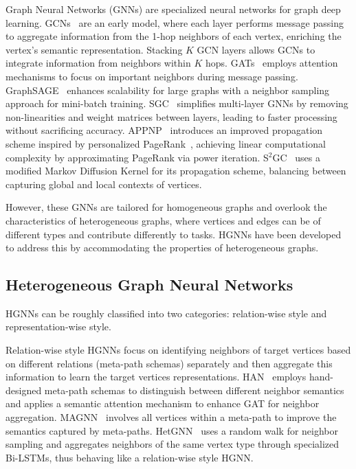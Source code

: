 \documentclass[lettersize,journal]{IEEEtran}
\begin{document}
Graph Neural Networks (GNNs) are specialized neural networks for graph deep learning.
GCNs~\cite{DBLP:conf/iclr/KipfW17} are an early model, where each layer performs message passing to aggregate information from the 1-hop neighbors of each vertex, enriching the vertex's semantic representation. 
Stacking $K$ GCN layers allows GCNs to integrate information from neighbors within $K$ hops.
GATs~\cite{DBLP:conf/iclr/VelickovicCCRLB18} employs attention mechanisms to focus on important neighbors during message passing.
GraphSAGE~\cite{DBLP:conf/nips/HamiltonYL17} enhances scalability for large graphs with a neighbor sampling approach for mini-batch training. 
SGC~\cite{DBLP:conf/icml/WuSZFYW19} simplifies multi-layer GNNs by removing non-linearities and weight matrices between layers, leading to faster processing without sacrificing accuracy.
APPNP~\cite{DBLP:conf/iclr/KlicperaBG19} introduces an improved propagation scheme inspired by personalized PageRank~\cite{Page1999ThePC}, achieving linear computational complexity by approximating PageRank via power iteration. 
S$^2$GC~\cite{DBLP:conf/iclr/ZhuK21} uses a modified Markov Diffusion Kernel for its propagation scheme, balancing between capturing global and local contexts of vertices.


However, these GNNs are tailored for homogeneous graphs and overlook the characteristics of heterogeneous graphs, where vertices and edges can be of different types and contribute differently to tasks. 
HGNNs have been developed to address this by accommodating the properties of heterogeneous graphs.








\subsection{Heterogeneous Graph Neural Networks}



HGNNs can be roughly classified into two categories: relation-wise style and representation-wise style.


Relation-wise style HGNNs focus on identifying neighbors of target vertices based on different relations (meta-path schemas) separately and then aggregate this information to learn the target vertices representations. 
HAN~\cite{DBLP:conf/www/WangJSWYCY19} employs hand-designed meta-path schemas to distinguish between different neighbor semantics and applies a semantic attention mechanism to enhance GAT for neighbor aggregation. 
MAGNN~\cite{DBLP:conf/www/0004ZMK20} involves all vertices within a meta-path to improve the semantics captured by meta-paths. 
HetGNN~\cite{DBLP:conf/kdd/ZhangSHSC19} uses a random walk for neighbor sampling and aggregates neighbors of the same vertex type through specialized Bi-LSTMs, thus behaving like a relation-wise style HGNN.
\end{document}
